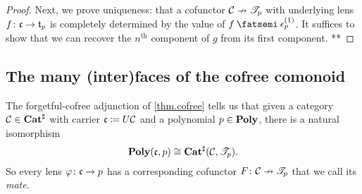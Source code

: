 \documentclass[Book-Poly]{subfiles}
\begin{document}
\begin{proof}
Next, we prove uniqueness: that a cofunctor $\mathcal{C}\nrightarrow\mathscr{T}_{p}$ with underlying lens $f\colon\mathfrak{c}\to\mathfrak{t}_p$ is completely determined by the value of $f\then\epsilon^{(1)}_p$.
It suffices to show that we can recover the $n^\text{th}$ component of $g$ from its first component.
**

\end{proof}



\subsection{The many (inter)faces of the cofree comonoid} \label{subsec.comon.cofree.cons.faces}

The forgetful-cofree adjunction of \cref{thm.cofree} tells us that given a category $\mathcal{C}\in\mathbf{Cat}^\sharp$ with carrier $\mathfrak{c}\coloneqq U\mathcal{C}$ and a polynomial $p\in\mathbf{Poly}$, there is a natural isomorphism
\[
    \mathbf{Poly}(\mathfrak{c},p)\cong\mathbf{Cat}^\sharp(\mathcal{C},\mathscr{T}_{p}).
\]
So every lens $\varphi\colon\mathfrak{c}\to p$ has a corresponding cofunctor $F\colon\mathcal{C}\nrightarrow\mathscr{T}_{p}$ that we call its \emph{mate}.
\end{document}
